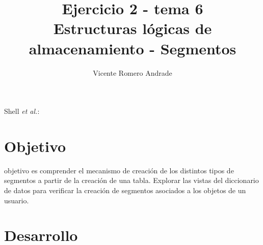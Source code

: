 \documentclass[journal]{IEEEtran}
\begin{document}
\title{Ejercicio 2 - tema 6 \\ Estructuras lógicas de almacenamiento - Segmentos}
%
\author{Vicente Romero Andrade}

%
{Shell \MakeLowercase{\textit{et al.}}: }

\maketitle


\IEEEpeerreviewmaketitle

\section{Objetivo}

 objetivo es comprender el mecanismo de creación de los distintos 
tipos de segmentos a partir de la creación de una tabla. Explorar las vistas del diccionario
de datos para verificar la creación de segmentos asociados a los objetos de un usuario.

\section{Desarrollo}
\end{document}
